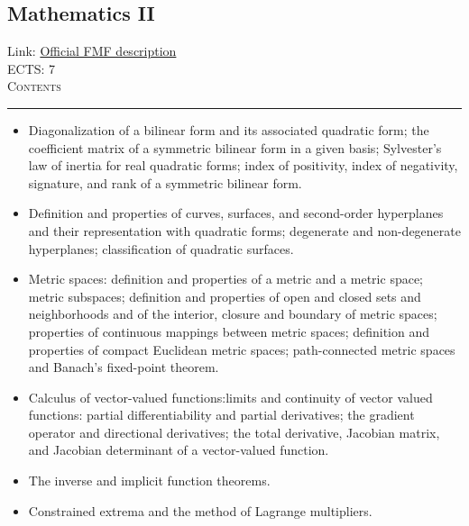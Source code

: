 \documentclass[11pt, a4paper]{article}
\newenvironment{course}[3]{
\subsection{#1}%
Link: \href{#2}{Official FMF description}\\%
ECTS: #3%
\vspace{1ex}
\\
{\large \textsc{Contents}}\\[-0.9ex]%
\rule{\textwidth}{0.5pt}
\vspace{-3ex}
}
{}
\newenvironment{chapter}[1]{
\begin{tcolorbox}[title=#1, breakable]
}
{\end{tcolorbox}}
\begin{document}
\begin{course}{Mathematics II}{https://www.fmf.uni-lj.si/en/study-physics/programmes/1fiz/2020/7000777/courses/521/}{7}
\begin{chapter}{Quadratic forms}
\begin{itemize}
            \item Diagonalization of a bilinear form and its associated quadratic form; the coefficient matrix of a symmetric bilinear form in a given basis; Sylvester's law of inertia for real quadratic forms; index of positivity, index of negativity, signature, and rank of a symmetric bilinear form.

            \item Definition and properties of curves, surfaces, and second-order hyperplanes and their representation with quadratic forms; degenerate and non-degenerate hyperplanes; classification of quadratic surfaces.
        
        \end{itemize}
    \end{chapter}
 
    \begin{chapter}{Vector functions of several variables}
        \begin{itemize}
        
            \item Metric spaces: definition and properties of a metric and a metric space; metric subspaces; definition and properties of open and closed sets and neighborhoods and of the interior, closure and boundary of metric spaces; properties of continuous mappings between metric spaces; definition and properties of compact Euclidean metric spaces; path-connected metric spaces and Banach's fixed-point theorem.

            \item Calculus of vector-valued functions:limits and continuity of vector valued functions: 
            partial differentiability and partial derivatives; the gradient operator and directional derivatives;
            the total derivative, Jacobian matrix, and Jacobian determinant of a vector-valued function.

            \item The inverse and implicit function theorems.

            \item Constrained extrema and the method of Lagrange multipliers.

        \end{itemize}
    \end{chapter}
\end{course}
\end{document}
